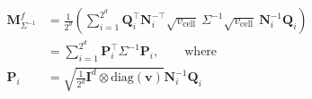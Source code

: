 \begin{equation}
\begin{aligned}
\mathbf{M}^f_{\Sigma^{-1}} &=
    \frac{1}{2^d}
    \left(\sum_{i=1}^{2^d}
        \mathbf{Q}_i^{\top} \mathbf{N}_i^{-\top} \sqrt{v_{\text{cell}}}
            ~ \Sigma^{-1}
        \sqrt{v_{\text{cell}}}  ~ \mathbf{N}_i^{-1} \mathbf{Q}_i
    \right)
\\
& =
    \sum_{i=1}^{2^d}
    \mathbf{P}_i^\top \Sigma^{-1} \mathbf{P}_i , \qquad \text{where}\\
\mathbf{P}_i & = \sqrt{ \frac{1}{2^d} \mathbf{I}^d \otimes \text{diag} \left( \mathbf{v} \right)} \mathbf{N}_i^{-1} \mathbf{Q}_i
\end{aligned}
\end{equation}
